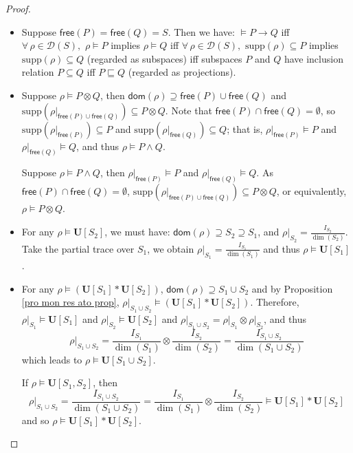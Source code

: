 \documentclass[conference,compsoc, 10pt]{IEEEtran}
\newcommand {\cD } {{\mathcal{D}}}
\newcommand {\id } {{I}}
\newcommand {\dom }[1] {{\mathsf{dom}\!\left(#1\right)}}
\newcommand {\free }[1] {{\mathsf{free}\left(#1\right)}}
\newcommand {\type }[1] {{\mathsf{dom}\!\left(#1\right)}}
\newcommand {\typef }[1] {{\mathsf{free}\left(#1\right)}}
\newcommand {\rt }[2] {{\left.{#1}\right|_{#2}}}
\newcommand {\unia } {{\mathbf{U}}}
\newcommand {\supp } {{\mathrm{supp}}}
\begin{document}
\begin{appendices}
\begin{proof}
\begin{itemize}
				\item Suppose $\free{P} = \free{Q} = S$. Then we have: $\models P\rightarrow Q$ iff $\forall\,\rho\in\cD(S),$ $\rho\models P$ implies $\rho\models Q$ iff $\forall\,\rho\in\cD(S),$ $\supp(\rho)\subseteq P$ implies $\supp(\rho)\subseteq Q$ (regarded as subspaces) iff subspaces $P$ and $Q$ have inclusion relation $P\subseteq Q$ iff $P\sqsubseteq Q$ (regarded as projections).
				
				\item Suppose $\rho\models P\otimes Q$, then $\type{\rho}\supseteq\typef{P}\cup\typef{Q}$ and $\supp(\rt{\rho}{\typef{P}\cup\typef{Q}})\subseteq P\otimes Q$. Note that $\typef{P}\cap\typef{Q}=\emptyset$, so $\supp(\rt{\rho}{\typef{P}})\subseteq P$ and $\supp(\rt{\rho}{\typef{Q}})\subseteq Q$; that is,  $\rt{\rho}{\typef{P}}\models P$ and $\rt{\rho}{\typef{Q}}\models Q$, and thus $\rho\models P\wedge Q$.
				
				Suppose $\rho\models P\wedge Q$, then $\rt{\rho}{\typef{P}}\models P$ and $\rt{\rho}{\typef{Q}}\models Q$. As $\typef{P}\cap\typef{Q}=\emptyset$, $\supp(\rt{\rho}{\typef{P}\cup\typef{Q}})\subseteq P\otimes Q$, or equivalently, $\rho\models P\otimes Q$.
				
				\item For any $\rho\models\unia[S_2]$, we must have: $\dom{\rho}\supseteq S_2\supseteq S_1$, and $\rt {\rho}{S_2} = \frac{I_{S_2}}{\dim (S_2)}$. Take the partial trace over $S_1$, we obtain $\rt {\rho}{S_1} = \frac{I_{S_1}}{\dim (S_1)}$ and thus $\rho\models\unia[S_1]$.
				
				\item For any $\rho\models(\unia[S_1]\ast\unia[S_2])$, $\dom{\rho}\supseteq S_1\cup S_2$ and by Proposition \ref{pro mon res ato prop}, $\rt{\rho}{S_1\cup S_2}\models(\unia[S_1]\ast\unia[S_2])$. Therefore, $\rt{\rho}{S_1}\models\unia[S_1]$ and $\rt{\rho}{S_2}\models\unia[S_2]$ and $\rt{\rho}{S_1\cup S_2} = \rt{\rho}{S_1}\otimes\rt{\rho}{S_2}$, and thus
				$$\rt{\rho}{S_1\cup S_2} = \frac{\id_{S_1}}{\dim(S_1)}\otimes\frac{\id_{S_2}}{\dim(S_2)} = \frac{\id_{S_1\cup S_2}}{\dim(S_1\cup S_2)}$$
				which leads to $\rho\models\unia[S_1\cup S_2]$.
				
				If $\rho\models\unia[S_1,S_2]$, then 
				$$\rt{\rho}{S_1\cup S_2} = \frac{\id_{S_1\cup S_2}}{\dim(S_1\cup S_2)} = \frac{\id_{S_1}}{\dim(S_1)}\otimes\frac{\id_{S_2}}{\dim(S_2)}\models \unia[S_1]\ast\unia[S_2]$$
				and so $\rho\models\unia[S_1]\ast\unia[S_2]$.
				

\end{itemize}
\end{proof}
\end{appendices}
\end{document}
